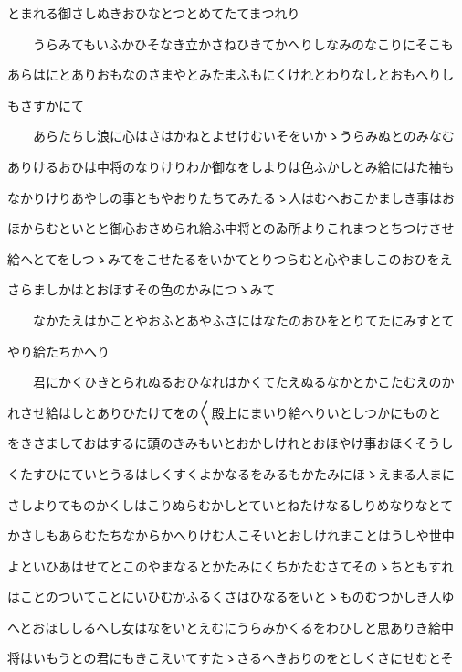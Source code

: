 \documentclass[a4paper,11pt,landscape]{ltjtarticle}
\begin{document}
\par\medskip
とまれる御さしぬきおひなとつとめてたてまつれり
\par\medskip
　　うらみてもいふかひそなき立かさねひきてかへりしなみのなこりにそこも
\par\medskip
あらはにとありおもなのさまやとみたまふもにくけれとわりなしとおもへりし
\par\medskip
もさすかにて
\par\medskip
　　あらたちし浪に心はさはかねとよせけむいそをいかゝうらみぬとのみなむ
\par\medskip
ありけるおひは中将のなりけりわか御なをしよりは色ふかしとみ給にはた袖も
\par\medskip
なかりけりあやしの事ともやおりたちてみたるゝ人はむへおこかましき事はお
\par\medskip
ほからむといとと御心おさめられ給ふ中将とのゐ所よりこれまつとちつけさせ
\par\medskip
給へとてをしつゝみてをこせたるをいかてとりつらむと心やましこのおひをえ
\par\medskip
さらましかはとおほすその色のかみにつゝみて
\par\medskip
　　なかたえはかことやおふとあやふさにはなたのおひをとりてたにみすとて
\par\medskip
やり給たちかへり
\par\medskip
　　君にかくひきとられぬるおひなれはかくてたえぬるなかとかこたむえのか
\par\medskip
れさせ給はしとありひたけてをの〱殿上にまいり給へりいとしつかにものと
\par\medskip
をきさましておはするに頭のきみもいとおかしけれとおほやけ事おほくそうし
\par\medskip
くたすひにていとうるはしくすくよかなるをみるもかたみにほゝえまる人まに
\par\medskip
さしよりてものかくしはこりぬらむかしとていとねたけなるしりめなりなとて
\par\medskip
かさしもあらむたちなからかへりけむ人こそいとおしけれまことはうしや世中
\par\medskip
よといひあはせてとこのやまなるとかたみにくちかたむさてそのゝちともすれ
\par\medskip
はことのついてことにいひむかふるくさはひなるをいとゝものむつかしき人ゆ
\par\medskip
へとおほししるへし女はなをいとえむにうらみかくるをわひしと思ありき給中
\par\medskip
将はいもうとの君にもきこえいてすたゝさるへきおりのをとしくさにせむとそ
\par\medskip
\end{document}

